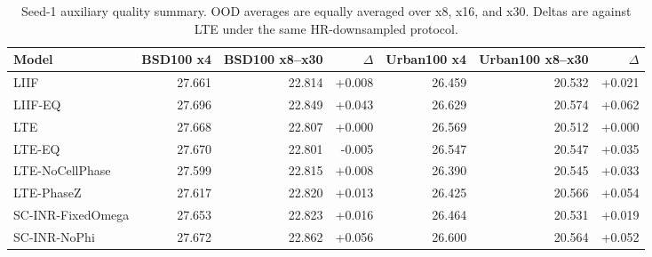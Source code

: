 \begin{table}[t]
\centering
\small
\caption{Seed-1 auxiliary quality summary. OOD averages are equally averaged over x8, x16, and x30. Deltas are against LTE under the same HR-downsampled protocol.}
\label{tab:seed1_aux_quality_psnr}
\begin{tabular}{lrrrrrr}
\toprule
Model & BSD100 x4 & BSD100 x8--x30 & $\Delta$ & Urban100 x4 & Urban100 x8--x30 & $\Delta$ \\
\midrule
LIIF & 27.661 & 22.814 & +0.008 & 26.459 & 20.532 & +0.021 \\
LIIF-EQ & 27.696 & 22.849 & +0.043 & 26.629 & 20.574 & +0.062 \\
LTE & 27.668 & 22.807 & +0.000 & 26.569 & 20.512 & +0.000 \\
LTE-EQ & 27.670 & 22.801 & -0.005 & 26.547 & 20.547 & +0.035 \\
LTE-NoCellPhase & 27.599 & 22.815 & +0.008 & 26.390 & 20.545 & +0.033 \\
LTE-PhaseZ & 27.617 & 22.820 & +0.013 & 26.425 & 20.566 & +0.054 \\
SC-INR-FixedOmega & 27.653 & 22.823 & +0.016 & 26.464 & 20.531 & +0.019 \\
SC-INR-NoPhi & 27.672 & 22.862 & +0.056 & 26.600 & 20.564 & +0.052 \\
\bottomrule
\end{tabular}
\end{table}
